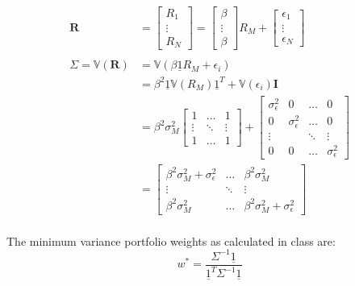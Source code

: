 \documentclass[
  oneside]{book}
\begin{document}
\[
\begin{aligned}
\mathbf{R} &= \left[ \begin{array}{c}
R_{1} \\
\vdots \\
R_{N}
\end{array} \right] = \left[ \begin{array}{c}
\beta \\
\vdots \\
\beta
\end{array} \right] R_{M} +
\left[ \begin{array}{c}
\epsilon_{1} \\
\vdots \\
\epsilon_{N}
\end{array}
\right] \\
\\
\Sigma = \mathbb{V}(\mathbf{R}) &= \mathbb{V}(\beta\underline{1} R_{M} + \epsilon_{i})\\
&= \beta^{2}  \underline{1} \mathbb{V}(R_{M})  \underline{1}^{T} + \mathbb{V}(\epsilon_{i}) \mathbf{I}\\
&= \beta^{2} \sigma_{M}^{2} \left[ \begin{array}{ccc}
1 & \dots & 1 \\
\vdots & \ddots{}  & \vdots \\
1 & \dots & 1
\end{array} \right]  + \left[ \begin{array}{cccc}
\sigma_{\epsilon}^{2} & 0 &  \dots  & 0 \\
0  & \sigma_{\epsilon}^{2} & \dots  & 0 \\
\vdots &  & \ddots  & \vdots \\
0 & 0  & \dots & \sigma_{\epsilon}^{2}
\end{array} \right] \\
&= \left[ \begin{array}{ccc}
\beta^{2} \sigma_{M}^{2} + \sigma_{\epsilon}^{2} &  \dots  & \beta^{2} \sigma_{M}^{2} \\
\vdots & \ddots  & \vdots \\
\beta^{2} \sigma_{M}^{2}  &  \dots & \beta^{2} \sigma_{M}^{2} + \sigma_{\epsilon}^{2}
\end{array} \right] \\
\end{aligned}
\]

The minimum variance portfolio weights as calculated in class are:
\[
w^{*} = \frac{\Sigma ^{-1}  \underline{1}}{\underline{1}^{T}\Sigma ^{-1}  \underline{1}}
\]
\end{document}
